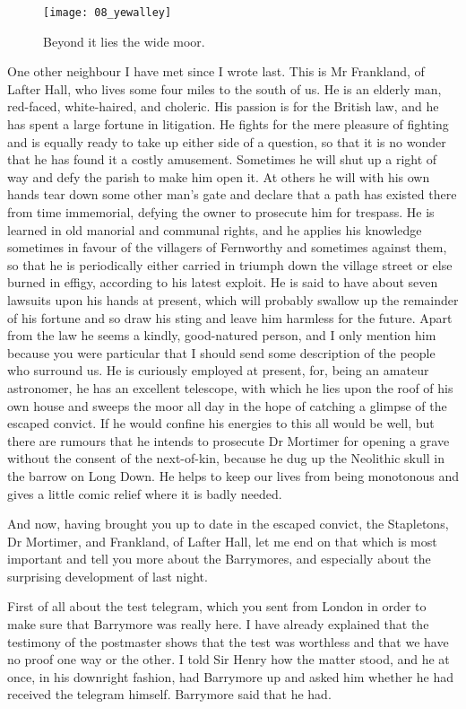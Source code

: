 \documentclass[paper=5.5in:8.5in,BCOR=7mm,twoside,DIV=calc,12pt,usegeometry,openany,chapterprefix,endperiod]{scrbook} %
\begin{document}
\begin{figure}[tbh]
\centering
\texttt{[image: 08\_yewalley]}
\caption{Beyond it lies the wide moor.}
\end{figure}

One other neighbour I have met since I wrote last. This is Mr Frankland, of Lafter Hall, who lives some four miles to the south of us. He is an elderly man, red-faced, white-haired, and choleric. His passion is for the British law, and he has spent a large fortune in litigation. He fights for the mere pleasure of fighting and is equally ready to take up either side of a question, so that it is no wonder that he has found it a costly amusement. Sometimes he will shut up a right of way and defy the parish to make him open it. At others he will with his own hands tear down some other man's gate and declare that a path has existed there from time immemorial, defying the owner to prosecute him for trespass. He is learned in old manorial and communal rights, and he applies his knowledge sometimes in favour of the villagers of Fernworthy and sometimes against them, so that he is periodically either carried in triumph down the village street or else burned in effigy, according to his latest exploit. He is said to have about seven lawsuits upon his hands at present, which will probably swallow up the remainder of his fortune and so draw his sting and leave him harmless for the future. Apart from the law he seems a kindly, good-natured person, and I only mention him because you were particular that I should send some description of the people who surround us. He is curiously employed at present, for, being an amateur astronomer, he has an excellent telescope, with which he lies upon the roof of his own house and sweeps the moor all day in the hope of catching a glimpse of the escaped convict. If he would confine his energies to this all would be well, but there are rumours that he intends to prosecute Dr Mortimer for opening a grave without the consent of the next-of-kin, because he dug up the Neolithic skull in the barrow on Long Down. He helps to keep our lives from being monotonous and gives a little comic relief where it is badly needed.

And now, having brought you up to date in the escaped convict, the Stapletons, Dr Mortimer, and Frankland, of Lafter Hall, let me end on that which is most important and tell you more about the Barrymores, and especially about the surprising development of last night.

First of all about the test telegram, which you sent from London in order to make sure that Barrymore was really here. I have already explained that the testimony of the postmaster shows that the test was worthless and that we have no proof one way or the other. I told Sir Henry how the matter stood, and he at once, in his downright fashion, had Barrymore up and asked him whether he had received the telegram himself. Barrymore said that he had.
\end{document}
